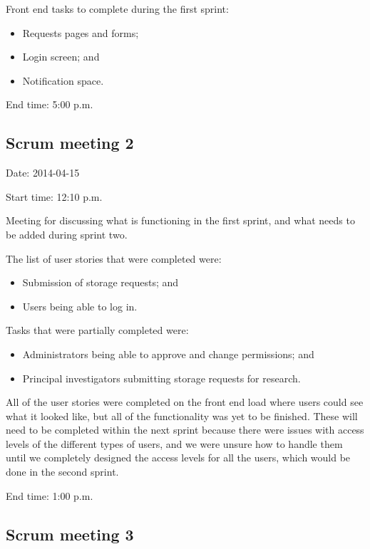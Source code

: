\documentclass[a4paper,titlepage,12pt]{article}
\begin{document}
Front end tasks to complete during the first sprint:

\begin{itemize}
	\item Requests pages and forms;
	\item Login screen; and
	\item Notification space.
\end{itemize}

End time: 5:00 p.m.

\newpage

\subsection{Scrum meeting 2}

Date: 2014-04-15

Start time: 12:10 p.m.

Meeting for discussing what is functioning in the first sprint, and what needs
to be added during sprint two.

The list of user stories that were completed were:

\begin{itemize}
	\item Submission of storage requests; and
	\item Users being able to log in.
\end{itemize}

Tasks that were partially completed were:

\begin{itemize}
	\item Administrators being able to approve and change permissions; and
	\item Principal investigators submitting storage requests for research.
\end{itemize}

All of the user stories were completed on the front end load where users could
see what it looked like, but all of the functionality was yet to be finished.
These will need to be completed within the next sprint because there were
issues with access levels of the different types of users, and we were unsure
how to handle them until we completely designed the access levels for all the
users, which would be done in the second sprint.

End time: 1:00 p.m.

\newpage

\subsection{Scrum meeting 3}
\end{document}
